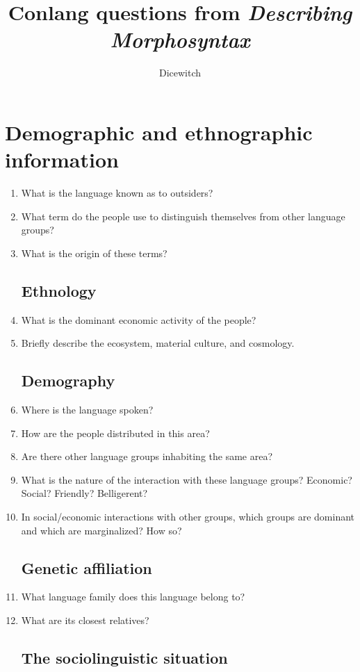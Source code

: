 \documentclass[]{scrartcl}
\title{Conlang questions from \textit{Describing Morphosyntax}}
\author{Dicewitch}
\begin{document}
\maketitle
\tableofcontents
\pagebreak
\section{Demographic and ethnographic information}
\begin{enumerate}
\subsection{Name of the language}
\item What is the language known as to outsiders?
\item What term do the people use to distinguish themselves from other language groups?
\item What is the origin of these terms?
\subsection{Ethnology}
\item What is the dominant economic activity of the people?
\item Briefly describe the ecosystem, material culture, and cosmology.
\subsection{Demography}
\item Where is the language spoken?
\item How are the people distributed in this area?
\item Are there other language groups inhabiting the same area?
\item What is the nature of the interaction with these language groups? Economic? Social? Friendly? Belligerent?

\item In social/economic interactions with other groups, which groups are dominant and which are marginalized?  How so?
\subsection{Genetic affiliation}
\item What language family does this language belong to?
\item What are its closest relatives?
\subsection{The sociolinguistic situation}

\end{enumerate}
\end{document}
